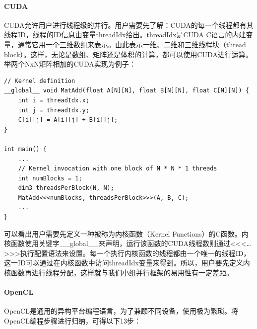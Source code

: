 \documentclass[paper=a4]{ctexart} %
\numberwithin{equation}{section} %
\numberwithin{figure}{section} %
\numberwithin{table}{section} %
\begin{document}
\paragraph{CUDA}
CUDA允许用户进行线程级的并行。用户需要先了解：CUDA的每一个线程都有其线程ID，线程的ID信息由变量threadIdx给出。threadIdx是CUDA C语言的内建变量，通常它用一个三维数组来表示。由此表示一维、二维和三维线程块（thread block）。这样，无论是数组、矩阵还是体积的计算，都可以使用CUDA进行运算。举两个NxN矩阵相加的CUDA实现为例子：

\begin{lstlisting}
// Kernel definition  
__global__ void MatAdd(float A[N][N], float B[N][N], float C[N][N]) {  
    int i = threadIdx.x;  
    int j = threadIdx.y;  
    C[i][j] = A[i][j] + B[i][j];  
}  
  
int main() {  
    ...  
    // Kernel invocation with one block of N * N * 1 threads  
    int numBlocks = 1;  
    dim3 threadsPerBlock(N, N);  
    MatAdd<<<numBlocks, threadsPerBlock>>>(A, B, C);  
    ...  
}  
\end{lstlisting}
可以看出用户需要先定义一种被称为内核函数（Kernel Functions）的C函数。内核函数使用关键字\_\_global\_\_来声明，运行该函数的CUDA线程数则通过<<<…>>>执行配置语法来设置。每一个执行内核函数的线程都由一个唯一的线程ID，这一ID可以通过在内核函数中访问threadIdx变量来得到。所以，用户要先定义内核函数再进行线程分配，这样就与我们小组并行框架的易用性有一定差距。

\paragraph{OpenCL}
OpenCL是通用的异构平台编程语言，为了兼顾不同设备，使用极为繁琐。将OpenCL编程步骤进行归纳，可得以下13步：
\end{document}
